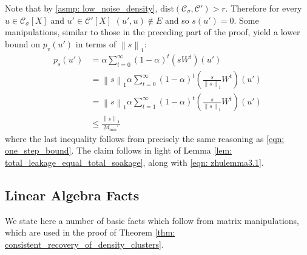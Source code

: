 \documentclass[11pt,twoside]{article}
\newcommand{\norm}[1]{\left\lVert#1\right\rVert}
\newcommand{\1}{\mathbbm{1}}
\newcommand{\dist}{\mathrm{dist}}
\newcommand{\pbf}{p}        %
\newcommand{\Xbf}{X}
\newcommand{\Wbf}{W}
\newcommand{\Cset}{\mathcal{C}}
\newcommand{\Csig}{\Cset_{\sigma}}
\newcommand{\degminpr}{d_{\min}'}
\begin{document}
	Note that by \ref{asmp: low_noise_density}, $\dist(\Csig,\Cset') > r$. Therefore for every $u \in \Csig[\Xbf]$ and $u' \in \Cset'[\Xbf]$ $(u',u) \not\in E$ and so $s(u') = 0$. Some manipulations, similar to those in the preceding part of the proof, yield a lower bound on $\pbf_v(u')$ in terms of $\norm{s}_1$:
	\begin{align*}
	\pbf_s(u') & = \alpha \sum_{t = 0}^{\infty} (1 - \alpha)^t \left(s \Wbf^t\right)(u') \\
	& = \norm{s}_1 \alpha \sum_{t = 0}^{\infty} (1 - \alpha)^t \left(\frac{s}{\norm{s}_1} \Wbf^t\right)(u') \\
	& = \norm{s}_1 \alpha \sum_{t = 1}^{\infty} (1 - \alpha)^t \left(\frac{s}{\norm{s}_1} \Wbf^t\right)(u') \\
	& \leq \frac{\norm{s}_1}{2\degminpr}
	\end{align*}
	where the last inequality follows from precisely the same reasoning as \eqref{eqn: one_step_bound}. The claim follows in light of Lemma \ref{lem: total_leakage_equal_total_soakage}, along with \eqref{eqn: zhulemma3.1}.

\subsection{Linear Algebra Facts}
\label{sec: linalg}

We state here a number of basic facts which follow from matrix manipulations, which are used in the proof of Theorem \ref{thm: consistent_recovery_of_density_clusters}. 
\end{document}
